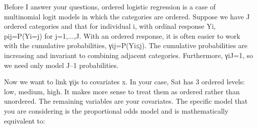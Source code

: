 Before I answer your questions, ordered logistic regression is a case of multinomial logit models in which the categories are ordered. Suppose we have J ordered categories and that for individual i, with ordinal response Yi, pij=P(Yi=j) for j=1,...,J. With an ordered response, it is often easier to work with the cumulative probabilities, γij=P(Yi≤j). The cumulative probabilities are increasing and invariant to combining adjacent categories. Furthermore, γiJ=1, so we need only model J–1 probabilities.

Now we want to link γijs to covariates x. In your case, Sat has 3 ordered levels: low, medium, high. It makes more sense to treat them as ordered rather than unordered. The remaining variables are your covariates. The specific model that you are considering is the proportional odds model and is mathematically equivalent to:


